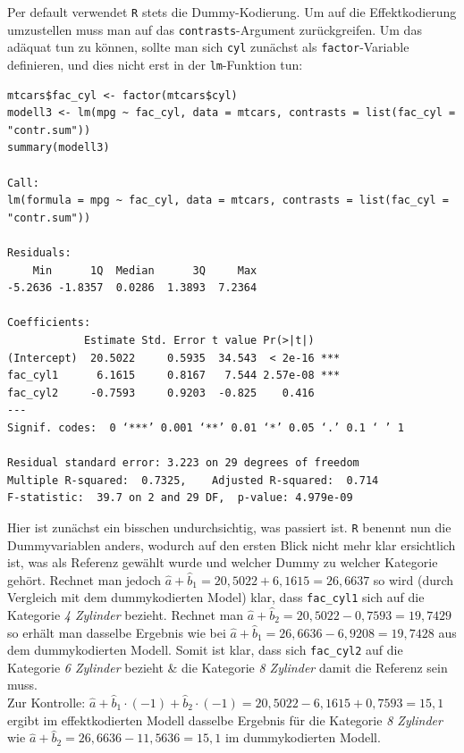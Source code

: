 \documentclass[a4paper]{article}
\newcommand\dangersign{%
 \makebox[1.8em][c]{%
 \makebox[0pt][c]{\raisebox{.15em}{\small!}}%
 \makebox[0pt][c]{\color{red}\Large$\triangle$}}}%
\begin{document}
\noindent \dangersign Per default verwendet \texttt{R} stets die Dummy-Kodierung. Um auf die Effektkodierung umzustellen muss man auf das \texttt{contrasts}-Argument zurückgreifen. Um das adäquat tun zu können, sollte man sich \texttt{cyl} zunächst als \texttt{factor}-Variable definieren, und dies nicht erst in der \texttt{lm}-Funktion tun:\\

\begin{small}
\begin{Verbatim}[frame=single]
mtcars$fac_cyl <- factor(mtcars$cyl)
modell3 <- lm(mpg ~ fac_cyl, data = mtcars, contrasts = list(fac_cyl = "contr.sum"))
summary(modell3)

Call:
lm(formula = mpg ~ fac_cyl, data = mtcars, contrasts = list(fac_cyl = "contr.sum"))

Residuals:
    Min      1Q  Median      3Q     Max 
-5.2636 -1.8357  0.0286  1.3893  7.2364 

Coefficients:
            Estimate Std. Error t value Pr(>|t|)    
(Intercept)  20.5022     0.5935  34.543  < 2e-16 ***
fac_cyl1      6.1615     0.8167   7.544 2.57e-08 ***
fac_cyl2     -0.7593     0.9203  -0.825    0.416    
---
Signif. codes:  0 ‘***’ 0.001 ‘**’ 0.01 ‘*’ 0.05 ‘.’ 0.1 ‘ ’ 1

Residual standard error: 3.223 on 29 degrees of freedom
Multiple R-squared:  0.7325,	Adjusted R-squared:  0.714 
F-statistic:  39.7 on 2 and 29 DF,  p-value: 4.979e-09
\end{Verbatim}
\end{small}
Hier ist zunächst ein bisschen undurchsichtig, was passiert ist. \texttt{R} benennt nun die Dummyvariablen anders, wodurch auf den ersten Blick nicht mehr klar ersichtlich ist, was als Referenz gewählt wurde und welcher Dummy zu welcher Kategorie gehört. Rechnet man jedoch $\hat a + \hat b_1 = 20,5022 + 6,1615 = 26,6637$ so wird (durch Vergleich mit dem dummykodierten Model) klar, dass \texttt{fac\_cyl1} sich auf die Kategorie \textit{4 Zylinder} bezieht. Rechnet man $\hat a + \hat b_2 = 20,5022 - 0,7593 = 19,7429$ so erhält man dasselbe Ergebnis wie bei $\hat a + \hat b_1 = 26,6636 - 6,9208 = 19,7428$ aus dem dummykodierten Modell. Somit ist klar, dass sich \texttt{fac\_cyl2} auf die Kategorie \textit{6 Zylinder} bezieht \& die Kategorie \textit{8 Zylinder} damit die Referenz sein muss.\\
Zur Kontrolle: $\hat a + \hat b_1 \cdot (-1) + \hat b_2 \cdot (-1) = 20,5022 - 6,1615 + 0,7593 = 15,1$ ergibt im effektkodierten Modell dasselbe Ergebnis für die Kategorie \textit{8 Zylinder} wie $\hat a + \hat b_2 = 26,6636 - 11,5636 = 15,1$ im dummykodierten Modell. 
\end{document}
